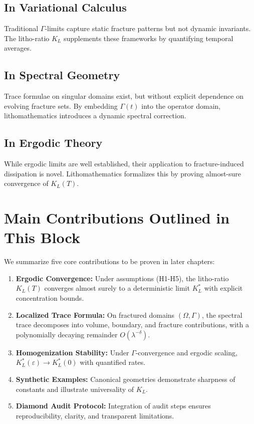 \subsection*{In Variational Calculus}
Traditional $\Gamma$-limits capture static fracture patterns but not dynamic invariants. The litho-ratio $K_L$ supplements these frameworks by quantifying temporal averages.

\subsection*{In Spectral Geometry}
Trace formulae on singular domains exist, but without explicit dependence on evolving fracture sets. By embedding $\Gamma(t)$ into the operator domain, lithomathematics introduces a dynamic spectral correction.

\subsection*{In Ergodic Theory}
While ergodic limits are well established, their application to fracture-induced dissipation is novel. Lithomathematics formalizes this by proving almost-sure convergence of $K_L(T)$.

\section*{Main Contributions Outlined in This Block}
We summarize five core contributions to be proven in later chapters:

\begin{enumerate}[label=C\arabic*., leftmargin=*]
\item \textbf{Ergodic Convergence:} Under assumptions (H1-H5), the litho-ratio $K_L(T)$ converges almost surely to a deterministic limit $K_L^*$ with explicit concentration bounds.
\item \textbf{Localized Trace Formula:} On fractured domains $(\Omega,\Gamma)$, the spectral trace decomposes into volume, boundary, and fracture contributions, with a polynomially decaying remainder $O(\lambda^{-\delta})$.
\item \textbf{Homogenization Stability:} Under $\Gamma$-convergence and ergodic scaling, $K_L^*(\varepsilon)\to K_L^*(0)$ with quantified rates.
\item \textbf{Synthetic Examples:} Canonical geometries demonstrate sharpness of constants and illustrate universality of $K_L$.
\item \textbf{Diamond Audit Protocol:} Integration of audit steps ensures reproducibility, clarity, and transparent limitations.
\end{enumerate}

